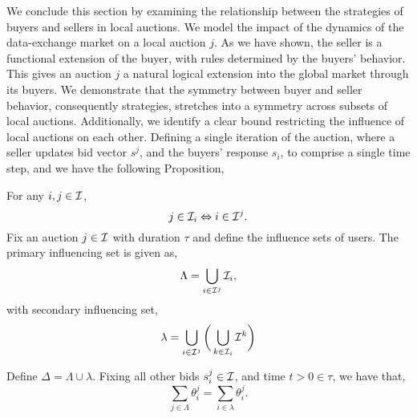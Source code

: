 We conclude this section by examining the relationship between the strategies of buyers and
sellers in local auctions. We model the impact of the dynamics of the
data-exchange market on a local auction $j$. As we have shown, the seller
is a functional extension of the buyer, with rules determined by the buyers'
behavior. This gives an auction $j$ a natural logical extension into the
global market through its buyers. We demonstrate that the symmetry between
buyer and seller behavior, consequently strategies, stretches into a symmetry across subsets of local
auctions. Additionally, we identify a clear bound restricting the influence of
local auctions on each other. Defining a single iteration of the auction, where a seller updates bid vector
$s^j$, and the buyers' response $s_i$, to comprise a single time step, and we
have the following Proposition,
{
\label{userunion}
For any $i,j\in \mathcal{I}$, 
\begin{equation}\label{jtoi}
j\in\mathcal{I}_i \Leftrightarrow i\in\mathcal{I}^j.
\end{equation}
Fix an auction $j\in\mathcal{I}$ with duration $\tau$ and define the influence sets of users. 
The primary influencing set is given as,
\begin{equation}\label{lambda}
    \Lambda = \displaystyle\bigcup_{i\in\mathcal{I}^j} \mathcal{I}_i,
\end{equation}
with secondary influencing set,
\begin{equation}\label{llambda}
    \lambda = \bigcup_{i\in\mathcal{I}^j} \bigg(\bigcup_{k\in\mathcal{I}_i} \mathcal{I}^k \bigg)
\end{equation}
\iffalse
(THE SELLERS ALL THE BUYERS IN $j$ HAVE IN COMMON! i.e. $j$ AND...)
\begin{equation}%
    \Lambda = \displaystyle\bigcap_{i\in\mcI^j} \mcI_i,
\end{equation}
(THE COLLECTION OF BUYERS FROM EACH $i$ THAT ARE COMMON ACROSS ALL THE $i$'s SELLER
POOLS)
\begin{equation}%
    \lambda = \bigcup_{i\in\mcI^j} \bigg(\bigcap_{k\in\mcI_i} \mcI^k \bigg)
\end{equation}
\fi
Define $\Delta = \Lambda \cup \lambda$.
Fixing all other bids $s_i^j \in \mathcal{I}$, and time $t>0\in\tau$, we have that,
\begin{equation}\label{union-eq}
    \displaystyle\sum_{j\in\Lambda} \theta_i^j = \sum_{i\in\lambda} \theta_i^j.
\end{equation}
}\\
